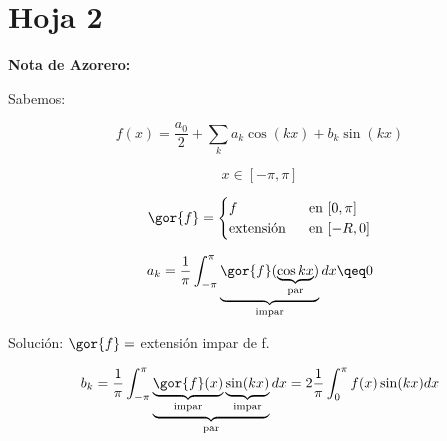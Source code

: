 \section{Hoja 2}

\begin{problem}[4]



\solution

\textbf{Nota de Azorero:}

Sabemos:

\[f(x) =  \frac{a_0}{2} +\sum_k a_k \cos (kx) + b_k \sin(kx)  \]

\[ x \in [-\pi,\pi]\]

\[ \gor{f} = \begin{cases}
	f & \text{ en }[0,\pi] \\
	\text{extensión } & \text{ en } [-R,0]
\end{cases} \]

\[a_k = \frac{1}{\pi}  \int^{\pi}_{-\pi} \underbrace{\gor{f}(\underbrace{\cos kx}_{\text{par}}) }_{\text{impar}} dx \qeq 0 \]

Solución: $\gor{f} = $ extensión impar de f.

\[ b_k = \frac{1}{\pi} \int_{-\pi}^{\pi} \underbrace{\underbrace{\gor{f}(x)}_{\text{impar}} \underbrace{\sin(kx)}_{\text{impar}}}_{\text{par}} dx = 2 \frac{1}{\pi} \int^\pi_{0} f(x) \sin(kx) dx \]


\end{problem}